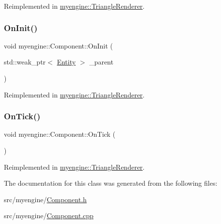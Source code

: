 Reimplemented in \hyperlink{classmyengine_1_1_triangle_renderer_a266db93e50781c64232b16fe4f323bad}{myengine\+::\+Triangle\+Renderer}.

\mbox{\label{classmyengine_1_1_component_a66aeffd4cb32f438a4fc604e74e50057}} 
\subsubsection{\texorpdfstring{On\+Init()}{OnInit()}}
{\footnotesize\ttfamily void myengine\+::\+Component\+::\+On\+Init (\begin{DoxyParamCaption}\item[{std\+::weak\+\_\+ptr$<$ \hyperlink{classmyengine_1_1_entity}{Entity} $>$}]{\+\_\+parent }\end{DoxyParamCaption})\hspace{0.3cm}{\ttfamily [virtual]}}



Reimplemented in \hyperlink{classmyengine_1_1_triangle_renderer_aef2e04f1dd0419df1a60eb0cd95fd86c}{myengine\+::\+Triangle\+Renderer}.

\mbox{\label{classmyengine_1_1_component_ac84472ba368a622afa0e25c47757291a}} 
\subsubsection{\texorpdfstring{On\+Tick()}{OnTick()}}
{\footnotesize\ttfamily void myengine\+::\+Component\+::\+On\+Tick (\begin{DoxyParamCaption}{ }\end{DoxyParamCaption})\hspace{0.3cm}{\ttfamily [virtual]}}



Reimplemented in \hyperlink{classmyengine_1_1_triangle_renderer_a6608a9c7954cff50e2575133dd6e5d88}{myengine\+::\+Triangle\+Renderer}.



The documentation for this class was generated from the following files\+:\begin{DoxyCompactItemize}
\item 
src/myengine/\hyperlink{_component_8h}{Component.\+h}\item 
src/myengine/\hyperlink{_component_8cpp}{Component.\+cpp}\end{DoxyCompactItemize}
